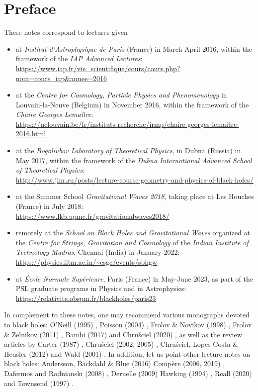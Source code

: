 \chapter*{Preface}

These notes correspond to lectures given
\begin{itemize}
\item at \emph{Institut d'Astrophysique de Paris} (France) in March-April 2016, within the
framework of the \emph{IAP Advanced Lectures}:\\
{\footnotesize\url{https://www.iap.fr/vie_scientifique/cours/cours.php?nom=cours_iap&annee=2016}}
\item at the \emph{Centre for Cosmology, Particle Physics and Phenomenology} in Louvain-la-Neuve
(Belgium) in November 2016, within the framework of the \emph{Chaire Georges Lemaître}:\\
{\footnotesize \url{https://uclouvain.be/fr/instituts-recherche/irmp/chaire-georges-lemaitre-2016.html}}
\item at the
\emph{Bogoliubov Laboratory of Theoretical Physics}, in Dubna (Russia) in May 2017,
within the framework of the \emph{Dubna International Advanced School of Theoretical Physics}:\\
{\footnotesize\url{http://www.jinr.ru/posts/lecture-course-geometry-and-physics-of-black-holes/}}
\item at the Summer School \emph{Gravitational Waves 2018}, taking place at Les Houches
(France) in July 2018:\\
{\footnotesize\url{https://www.lkb.upmc.fr/gravitationalwaves2018/}}
\item remotely at the \emph{School on Black Holes and Gravitational Waves}
organized at the
\emph{Centre for Strings, Gravitation and Cosmology} of the
\emph{Indian Institute of Technology Madras}, Chennai (India) in January 2022:\\
{\footnotesize\url{https://physics.iitm.ac.in/~csgc/events/sbhgw}}
\item at \emph{École Normale Supérieure}, Paris (France) in May-June 2023, as
part of the PSL graduate programs in Physics and in Astrophysics:\\
{\footnotesize\url{https://relativite.obspm.fr/blackholes/paris23}}
\end{itemize}

\vspace{2ex}

In complement to these notes, one may recommend various monographs
devoted to black holes:  O'Neill (1995) \cite{ONeil95}, Poisson (2004) \cite{Poiss04}, Frolov \& Novikov (1998) \cite{FroloN98},
Frolov \& Zelnikov (2011) \cite{FroloZ11}, Bambi (2017) \cite{Bambi17} and Chru\'sciel (2020) \cite{Chrus20}, as well as the review
articles by Carter (1987) \cite{Carte87}, Chru\'sciel (2002, 2005) \cite{Chrus02, Chrus05},
Chru\'sciel, Lopes Costa \& Heusler (2012) \cite{ChrusLH12} and Wald (2001) \cite{Wald01}.
In addition, let us point other lecture notes on black holes:
Andersson, Bäckdahl \& Blue (2016) \cite{AnderBB16}
Compère (2006, 2019) \cite{Compe06,Compe19},
Dafermos and Rodnianski (2008) \cite{DaferR13},  Deruelle (2009) \cite{Derue09}
Hawking (1994) \cite{Hawki94,HawkiP15}, Reall (2020) \cite{Reall20} and Townsend (1997) \cite{Towns97}.

